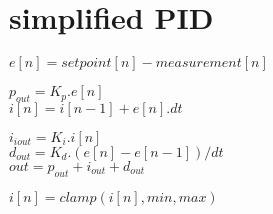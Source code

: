 \documentclass[12pt]{article}
\begin{document}
	\section{simplified PID}

	$ e[n] = setpoint [n] - measurement[n] $
	
	$ p_{out} = K_p . e[n] $ \\
	
	$ i[n] = i[n-1] + e[n] . dt $
	
	$ i_{iout} = K_i . i[n] $ \\
	
	$ d_{out} = K_d . (e[n] - e[n-1]) / dt $ \\
	
	$ out = p_{out} + i_{out} + d_{out} $
	
	$ i[n] = clamp(i[n], min, max) $
\end{document}
